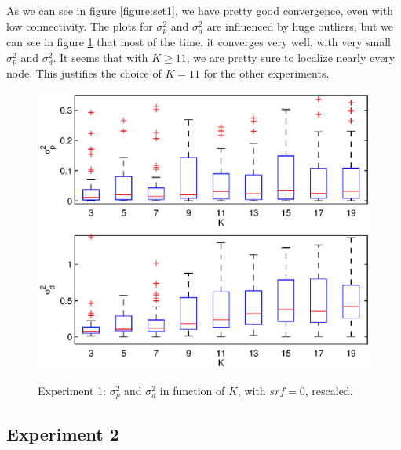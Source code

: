 \documentclass[letterpaper, 10 pt, conference]{ieeeconf}  %
\begin{document}
As we can see in figure \ref{figure:set1}, we have pretty good convergence, even with low connectivity. The plots for $\sigma_p^2$ and $\sigma_d^2$ are influenced by huge outliers, but we can see in figure \ref{fig:set1-rescaled} that most of the time, it converges very well, with very small $\sigma_p^2$ and $\sigma_d^2$. It seems that with $K \geq 11$, we are pretty sure to localize nearly every node. This justifies the choice of $K=11$ for the other experiments.

\begin{figure}[ht!]
\centering
\includegraphics[width=1\columnwidth]{set1-sp-nosrf-ylim.eps}
\includegraphics[width=1\columnwidth]{set1-sd-nosrf-ylim.eps}
\caption{\label{fig:set1-rescaled}Experiment 1: $\sigma_p^2$ and $\sigma_d^2$ in function of $K$, with $srf=0$, rescaled.}
\end{figure}

\subsection{Experiment 2}
\end{document}

